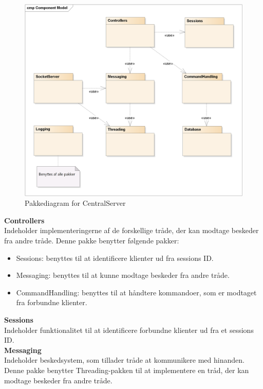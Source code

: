 \begin{figure}[H]
    \centering
    \includegraphics[width=1\textwidth]{../Projektdokumtation/Systemdesign/CentralServer/Images/Packages.png}
    \caption{Pakkediagram for CentralServer}
    \label{fig:CSPackages}
\end{figure}


\textbf{Controllers}\\
Indeholder implementeringerne af de forskellige tråde, der kan modtage beskeder fra andre tråde. Denne pakke benytter følgende pakker:

\begin{itemize}
	\item Sessions: benyttes til at identificere klienter ud fra sessions ID.
	\item Messaging: benyttes til at kunne modtage beskeder fra andre tråde.
	\item CommandHandling: benyttes til at håndtere kommandoer, som er modtaget fra forbundne klienter.
\end{itemize}


\textbf{Sessions}\\
Indeholder funktionalitet til at identificere forbundne klienter ud fra et sessions ID.\\

\textbf{Messaging}\\
Indeholder beskedsystem, som tillader tråde at kommunikere med hinanden. Denne pakke benytter Threading-pakken til at implementere en tråd, der kan modtage beskeder fra andre tråde.\\

